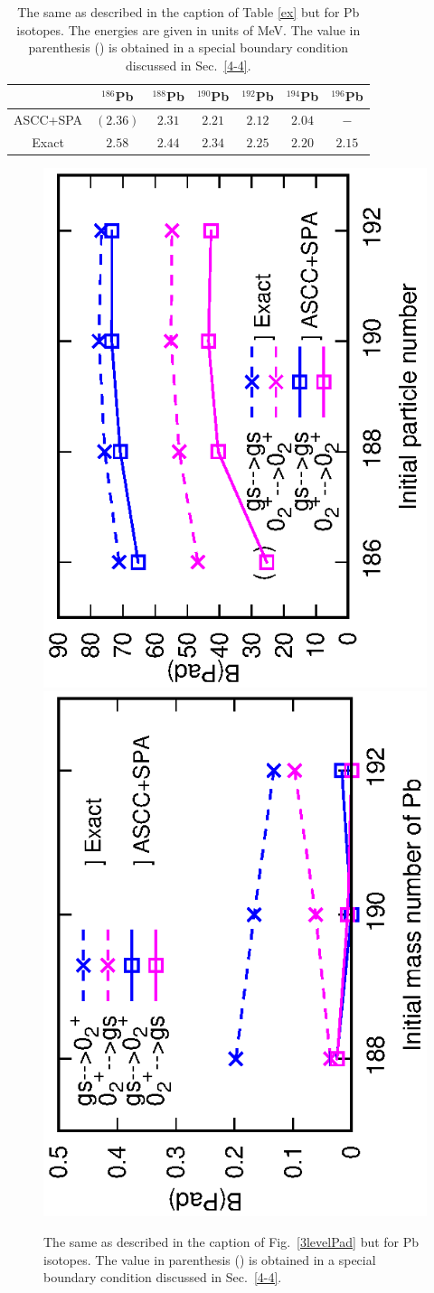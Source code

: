 \documentclass[11pt]{book} %
\begin{document}
\begin{table}[bt]
\begin{center}
\caption{The same as described in the caption of Table \ref{ex} but for Pb isotopes. The energies are given in units of MeV. The value in parenthesis () is obtained in a special boundary condition discussed in Sec.~\ref{4-4}.}
\begin{tabular}{c|cccccc}
  \toprule
   & ${}^{186}$Pb & ${}^{188}$Pb & ${}^{190}$Pb & ${}^{192}$Pb & ${}^{194}$Pb & ${}^{196}$Pb\\ \hline
ASCC+SPA & $(2.36)$ & $2.31$ & $2.21$ & $2.12$ & $2.04$ & $-$ \\ 
Exact & $2.58$ & $2.44$ & $2.34$ & $2.25$ & $2.20$ & $2.15$ \\
  \bottomrule
\end{tabular}
\label{Pb_ex}
\end{center}
\end{table}
\begin{figure}[tb]
 \begin{minipage}{1\hsize}
 \begin{center}
  \includegraphics[height=0.45\textwidth,angle=-90]{images/Pbintra_trans.eps}
  \includegraphics[height=0.45\textwidth,angle=-90]{images/Pbinter_trans.eps}
 \end{center}
 \end{minipage}
	\caption{The same as described in the caption of Fig.~\ref{3levelPad} but for Pb isotopes. The value in parenthesis () is obtained in a special boundary condition discussed in Sec.~\ref{4-4}.
}
 \label{PbPad}
\end{figure}
\end{document}
